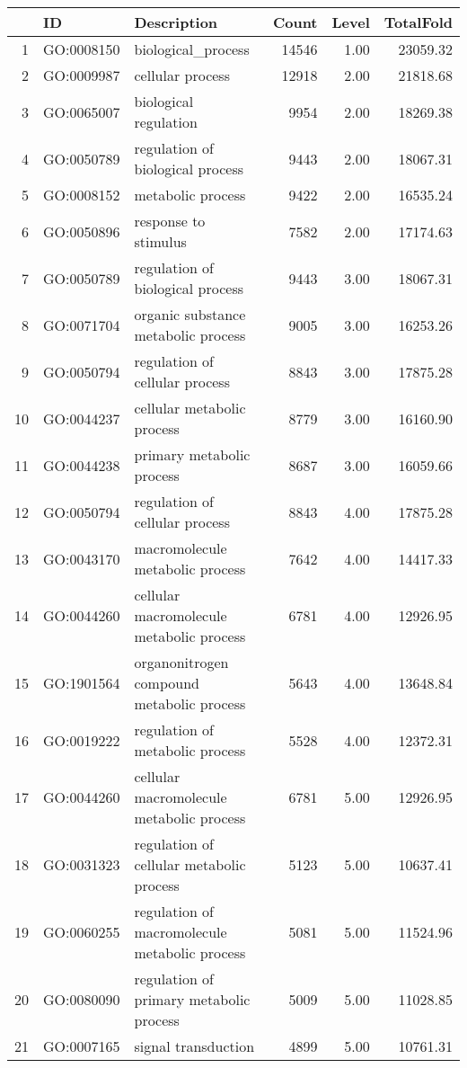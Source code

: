 \begin{table}[ht]
\centering
\begin{tabular}{rllrrr}
  \hline
 & ID & Description & Count & Level & TotalFold \\ 
  \hline
1 & GO:0008150 & biological\_process & 14546 & 1.00 & 23059.32 \\ 
  2 & GO:0009987 & cellular process & 12918 & 2.00 & 21818.68 \\ 
  3 & GO:0065007 & biological regulation & 9954 & 2.00 & 18269.38 \\ 
  4 & GO:0050789 & regulation of biological process & 9443 & 2.00 & 18067.31 \\ 
  5 & GO:0008152 & metabolic process & 9422 & 2.00 & 16535.24 \\ 
  6 & GO:0050896 & response to stimulus & 7582 & 2.00 & 17174.63 \\ 
  7 & GO:0050789 & regulation of biological process & 9443 & 3.00 & 18067.31 \\ 
  8 & GO:0071704 & organic substance metabolic process & 9005 & 3.00 & 16253.26 \\ 
  9 & GO:0050794 & regulation of cellular process & 8843 & 3.00 & 17875.28 \\ 
  10 & GO:0044237 & cellular metabolic process & 8779 & 3.00 & 16160.90 \\ 
  11 & GO:0044238 & primary metabolic process & 8687 & 3.00 & 16059.66 \\ 
  12 & GO:0050794 & regulation of cellular process & 8843 & 4.00 & 17875.28 \\ 
  13 & GO:0043170 & macromolecule metabolic process & 7642 & 4.00 & 14417.33 \\ 
  14 & GO:0044260 & cellular macromolecule metabolic process & 6781 & 4.00 & 12926.95 \\ 
  15 & GO:1901564 & organonitrogen compound metabolic process & 5643 & 4.00 & 13648.84 \\ 
  16 & GO:0019222 & regulation of metabolic process & 5528 & 4.00 & 12372.31 \\ 
  17 & GO:0044260 & cellular macromolecule metabolic process & 6781 & 5.00 & 12926.95 \\ 
  18 & GO:0031323 & regulation of cellular metabolic process & 5123 & 5.00 & 10637.41 \\ 
  19 & GO:0060255 & regulation of macromolecule metabolic process & 5081 & 5.00 & 11524.96 \\ 
  20 & GO:0080090 & regulation of primary metabolic process & 5009 & 5.00 & 11028.85 \\ 
  21 & GO:0007165 & signal transduction & 4899 & 5.00 & 10761.31 \\ 
   \hline
\end{tabular}
\end{table}
